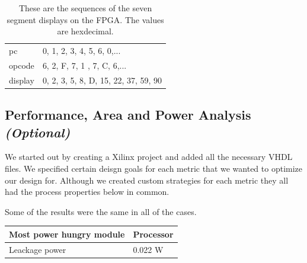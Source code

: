 \documentclass[a4paper,11pt]{article}
\begin{document}
\begin{table}[h!]
\centering
\begin{tabular}{|l|l|} \hline
  pc & 0, 1, 2, 3, 4, 5, 6, 0,...\\
  opcode & 6, 2, F, 7, 1 , 7, C, 6,... \\
  display & 0, 2, 3, 5, 8, D, 15, 22, 37, 59, 90\\ \hline
\end{tabular}
\label{tab:sequences}
\caption{These are the sequences of the seven segment displays on the FPGA. The values are hexdecimal.}
\end{table}

\newpage
\subsection{Performance, Area and Power Analysis \emph{(Optional)}}

We started out by creating a Xilinx project and added all the necessary VHDL files. We specified certain deisgn goals for each metric that we wanted to optimize our design for. Although we created custom strategies for each metric they all had the process properties below in common. 


Some of the results were the same in all of the cases.

\begin{tabular}{|l|l|} \hline
  Most power hungry module & Processor \\ \hline
  Leackage power & 0.022 W \\ \hline
\end{tabular}
\end{document}

